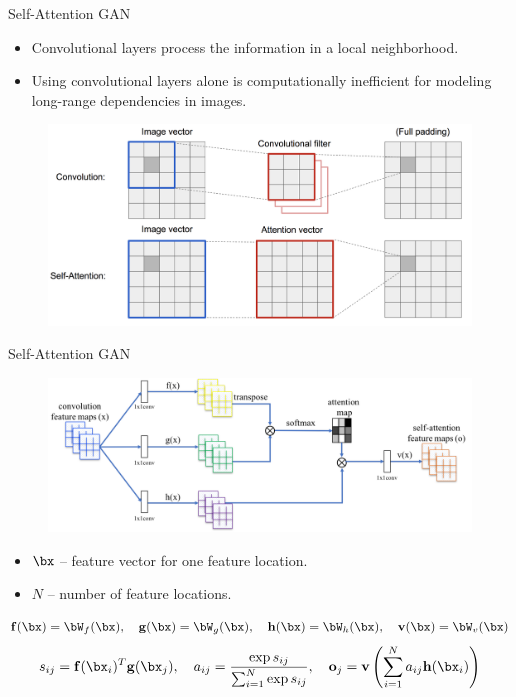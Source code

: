 \begin{frame}{Self-Attention GAN}
	\begin{itemize}
		\item Convolutional layers process the information in a local neighborhood.
		\item Using convolutional layers alone is computationally inefficient for modeling long-range dependencies in images.
	\end{itemize}
	\begin{figure}
		\centering
		\includegraphics[width=0.9\linewidth]{figs/conv-vs-sa}
	\end{figure}
\end{frame}
\begin{frame}{Self-Attention GAN}
	\begin{figure}
		\centering
		\includegraphics[width=0.9\linewidth]{figs/self-attention}
	\end{figure}
	\vspace{-0.2cm}
	\begin{itemize}
		\item $\bx$ -- feature vector for one feature location.
		\item $N$ -- number of feature locations.
	\end{itemize}
	\vspace{0.5cm}
	\[
		\mathbf{f}(\bx) = \bW_f(\bx), \quad \mathbf{g}(\bx) = \bW_g(\bx), \quad \mathbf{h}(\bx) = \bW_h(\bx), \quad \mathbf{v}(\bx) = \bW_v(\bx)
	\]
	\[
		s_{ij} = \mathbf{f}(\bx_i)^T \mathbf{g}(\bx_j), \quad a_{ij} = \frac{\exp{s_{ij}}}{\sum_{i=1}^N \exp{s_{ij}}}, \quad \textbf{o}_j = \textbf{v}\left( \sum_{i=1}^N a_{ij} \mathbf{h}(\bx_i) \right)
	\]
\end{frame}
